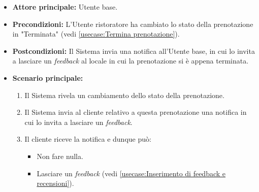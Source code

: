 \label{usecase:Notifica di inserimento di un feedback}
\begin{itemize}
	\item \textbf{Attore principale:} Utente base.

	
	\item \textbf{Precondizioni:} L'Utente ristoratore ha cambiato lo stato della prenotazione in "Terminata" (vedi \autoref{usecase:Termina prenotazione}).

    
	\item \textbf{Postcondizioni:} Il Sistema invia una notifica all'Utente base, in cui lo invita a lasciare un \textit{feedback} al locale in cui la prenotazione si è appena terminata.
     
	\item \textbf{Scenario principale:}
	      \begin{enumerate}
                \item Il Sistema rivela un cambiamento dello stato della prenotazione.
                \item Il Sistema invia al cliente relativo a questa prenotazione una notifica in cui lo invita a lasciare un \textit{feedback}.
                \item Il cliente riceve la notifica e dunque può:
                \begin{itemize}
                    \item Non fare nulla.
                    \item Lasciare un \textit{feedback} (vedi \autoref{usecase:Inserimento di feedback e recensioni}).
                \end{itemize}
	      \end{enumerate}
\end{itemize}